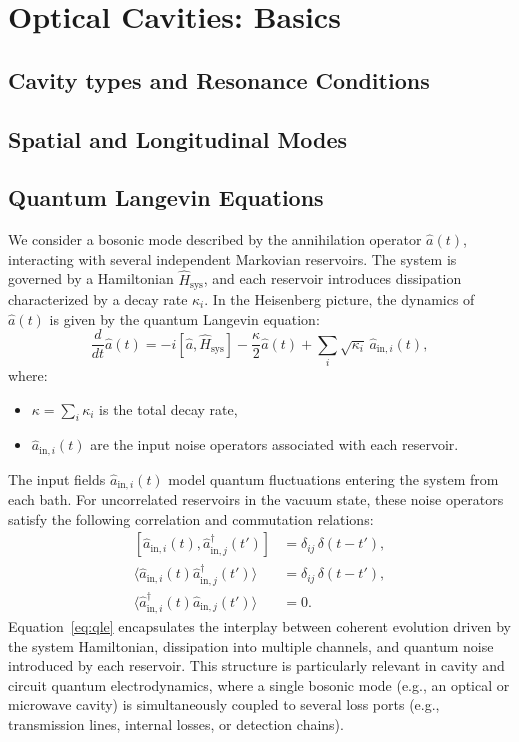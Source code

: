 \section{Optical Cavities: Basics}
\subsection{Cavity types and Resonance Conditions}
\subsection{Spatial and Longitudinal Modes}
\subsection{Quantum Langevin Equations}

We consider a bosonic mode described by the annihilation operator \(\hat{a}(t)\), interacting with several independent Markovian reservoirs. The system is governed by a Hamiltonian \(\hat{H}_\mathrm{sys}\), and each reservoir introduces dissipation characterized by a decay rate \(\kappa_i\). In the Heisenberg picture, the dynamics of \(\hat{a}(t)\) is given by the quantum Langevin equation:
%
\begin{equation}
\frac{d}{dt} \hat{a}(t) = -i [\hat{a}, \hat{H}_\mathrm{sys}] - \frac{\kappa}{2} \hat{a}(t) + \sum_i \sqrt{\kappa_i} \, \hat{a}_{\mathrm{in},i}(t),
\label{eq:qle}
\end{equation}
where:
\begin{itemize}
  \item \(\kappa = \sum_i \kappa_i\) is the total decay rate,
  \item \(\hat{a}_{\mathrm{in},i}(t)\) are the input noise operators associated with each reservoir.
\end{itemize}
The input fields \(\hat{a}_{\mathrm{in},i}(t)\) model quantum fluctuations entering the system from each bath. For uncorrelated reservoirs in the vacuum state, these noise operators satisfy the following correlation and commutation relations:
%
\begin{align}
\left[ \hat{a}_{\mathrm{in},i}(t), \hat{a}^\dagger_{\mathrm{in},j}(t') \right] &= \delta_{ij} \, \delta(t - t'), \\
\langle \hat{a}_{\mathrm{in},i}(t) \hat{a}^\dagger_{\mathrm{in},j}(t') \rangle &= \delta_{ij} \, \delta(t - t'), \\
\langle \hat{a}^\dagger_{\mathrm{in},i}(t) \hat{a}_{\mathrm{in},j}(t') \rangle &= 0.
\end{align}
Equation~\eqref{eq:qle} encapsulates the interplay between coherent evolution driven by the system Hamiltonian, dissipation into multiple channels, and quantum noise introduced by each reservoir. This structure is particularly relevant in cavity and circuit quantum electrodynamics, where a single bosonic mode (e.g., an optical or microwave cavity) is simultaneously coupled to several loss ports (e.g., transmission lines, internal losses, or detection chains).
